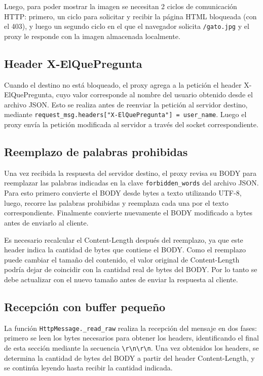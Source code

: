 \documentclass[
	spanish, %
	letterpaper, oneside
]{article}
\newcommand{\code}[1]{\texttt{#1}}    %
\newcommand{\cfgkey}[1]{\texttt{#1}}  %
\newcommand{\hdr}[1]{#1}              %
\newcommand{\status}[1]{#1}           %
\begin{document}
Luego, para poder mostrar la imagen se necesitan 2 ciclos de comunicación HTTP: primero, un ciclo para solicitar y recibir la página HTML bloqueada (con el \status{403}), y luego un segundo ciclo en el que el navegador solicita \code{/gato.jpg} y el proxy le responde con la imagen almacenada localmente.

\subsection{Header X-ElQuePregunta}
Cuando el destino no está bloqueado, el proxy agrega a la petición el header \hdr{X-ElQuePregunta}, cuyo valor corresponde al nombre del usuario obtenido desde el archivo JSON. Esto se realiza antes de reenviar la petición al servidor destino, mediante \code{request\_msg.headers["X-ElQuePregunta"] = user\_name}. Luego el proxy envía la petición modificada al servidor a través del socket correspondiente.

\subsection{Reemplazo de palabras prohibidas}
Una vez recibida la respuesta del servidor destino, el proxy revisa su BODY para reemplazar las palabras indicadas en la clave \cfgkey{forbidden\_words} del archivo JSON. Para esto primero convierte el BODY desde bytes a texto utilizando UTF-8, luego, recorre las palabras prohibidas y reemplaza cada una por el texto correspondiente. Finalmente convierte nuevamente el BODY modificado a bytes antes de enviarlo al cliente.

Es necesario recalcular el \hdr{Content-Length} después del reemplazo, ya que este header indica la cantidad de bytes que contiene el BODY. Como el reemplazo puede cambiar el tamaño del contenido, el valor original de \hdr{Content-Length} podría dejar de coincidir con la cantidad real de bytes del BODY. Por lo tanto se debe actualizar con el nuevo tamaño antes de enviar la respuesta al cliente.

\subsection{Recepción con buffer pequeño}
La función \code{HttpMessage.\_read\_raw} realiza la recepción del mensaje en dos fases: primero se leen los bytes necesarios para obtener los headers, identificando el final de esta sección mediante la secuencia \verb|\r\n\r\n|. Una vez obtenidos los headers, se determina la cantidad de bytes del BODY a partir del header \hdr{Content-Length}, y se continúa leyendo hasta recibir la cantidad indicada.
\end{document}
